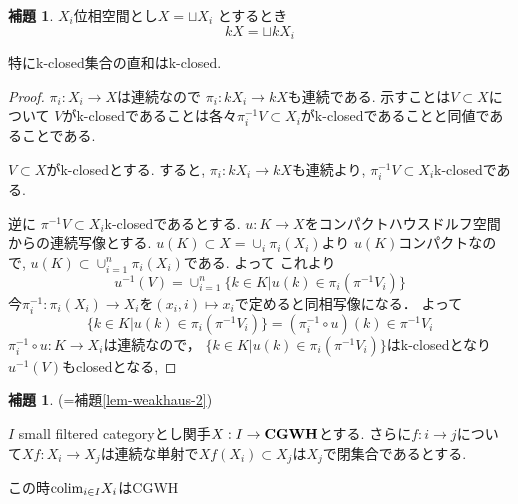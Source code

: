 \documentclass[dvipdfmx,a4paper,11pt]{report}
\newcommand{\colim}{{\rm colim}}
\theoremstyle{definition}
\newtheorem{lem}[thm]{補題}
\newcommand{\xr}[1]{\textcolor{red}{#1}}
\begin{document}
\begin{tcolorbox}
 [colback = white, colframe = green!35!black, fonttitle = \bfseries,breakable = true]
\begin{lem}
\label{lem-k-space}
$X_i$位相空間とし$X = \sqcup X_{i}$
とするとき
$$
kX = \sqcup kX_i
$$

特にk-closed集合の直和はk-closed.
\end{lem}
\end{tcolorbox}
\begin{proof}
$\pi_i : X_i \to X$は連続なので
$\pi_i : kX_i \to kX$も連続である.
示すことは$V \subset X$について
$V$がk-closedであることは各々$\pi_{i}^{-1}V \subset X_i$がk-closedであることと同値であることである. 

$V \subset X$がk-closedとする.
すると, $\pi_{i}: kX_i \to kX$も連続より, $\pi_{i}^{-1}V \subset X_i$k-closedである.

逆に $\pi^{-1}V \subset X_i$k-closedであるとする. 
$u : K\to X$をコンパクトハウスドルフ空間からの連続写像とする. 
$u(K) \subset X = \cup_{i}\pi_{i}(X_i)$より
$u(K)$コンパクトなので, $u(K) \subset \cup_{i=1}^{n}\pi_{i}(X_i)$である.
よって
これより
$$
u^{-1}(V)
=\cup_{i=1}^{n}\{ k \in K | u(k) \in \pi_{i}( \pi^{-1}V_i) \}
$$
今$\pi_{i}^{-1}: \pi_{i}(X_i) \to X_i$を$(x_i, i) \mapsto x_i$で定めると同相写像になる．
よって
$$
\{ k \in K | u(k) \in \pi_{i}( \pi^{-1}V_i) \}
=
(\pi_{i}^{-1}\circ u)(k) \in \pi^{-1}V_i
$$
$\pi_{i}^{-1}\circ u : K \to X_i$は連続なので， $\{ k \in K | u(k) \in \pi_{i}( \pi^{-1}V_i) \}$はk-closedとなり
$u^{-1}(V)$もclosedとなる, 
\end{proof}


\begin{tcolorbox}
 [colback = white, colframe = green!35!black, fonttitle = \bfseries,breakable = true]

\begin{lem}\cite[Lemma 3.3]{Str}{(=補題\ref{lem-weakhaus-2})}

$I$ small filtered categoryとし関手$X : I \to {\bf CGWH}$とする. 
さらに$f: i \to j$について$Xf : X_i \to X_j$は連続な単射で$Xf(X_i) \subset X_j$は$X_j$で閉集合であるとする. 

この時$\colim_{i \in I}X_i$はCGWH
\end{lem}
\end{tcolorbox}
\end{document}
